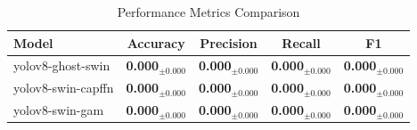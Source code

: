 
\begin{table}[htbp]
\centering
\caption{Performance Metrics Comparison}
\label{tab:performance}
\begin{tabular}{lcccc}
\toprule
\textbf{Model} & \textbf{Accuracy} & \textbf{Precision} & \textbf{Recall} & \textbf{F1} \\
\midrule
yolov8-ghost-swin & \textbf{0.000$_{\pm0.000}$} & \textbf{0.000$_{\pm0.000}$} & \textbf{0.000$_{\pm0.000}$} & \textbf{0.000$_{\pm0.000}$} \\
yolov8-swin-capffn & \textbf{0.000$_{\pm0.000}$} & \textbf{0.000$_{\pm0.000}$} & \textbf{0.000$_{\pm0.000}$} & \textbf{0.000$_{\pm0.000}$} \\
yolov8-swin-gam & \textbf{0.000$_{\pm0.000}$} & \textbf{0.000$_{\pm0.000}$} & \textbf{0.000$_{\pm0.000}$} & \textbf{0.000$_{\pm0.000}$} \\

\bottomrule
\end{tabular}
\end{table}

